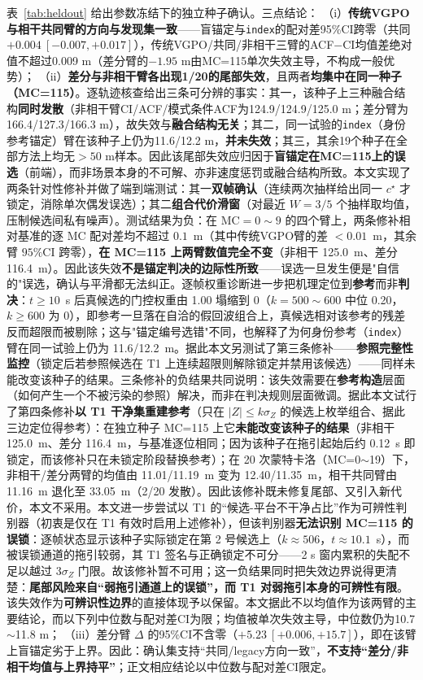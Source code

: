 \documentclass[UTF8,a4paper,zihao=-4]{ctexart}
\begin{document}
表~\ref{tab:heldout} 给出参数冻结下的独立种子确认。三点结论：
（i）\textbf{传统VGPO与相干共同臂的方向与发现集一致}——盲锚定与\texttt{index}的配对差95\%CI跨零（共同 $+0.004\ [-0.007,+0.017]$），传统VGPO/共同/非相干三臂的ACF$-$CI均值差绝对值不超过0.009 m（差分臂的$-1.95$ m由MC=115单次失效主导，不构成一般优势）；
（ii）\textbf{差分与非相干臂各出现1/20的尾部失效}，且两者\textbf{均集中在同一种子（MC=115）}。逐轨迹核查给出三条可分辨的事实：其一，该种子上三种融合结构\textbf{同时发散}（非相干臂CI/ACF/模式条件ACF为124.9/124.9/125.0 m；差分臂为166.4/127.3/166.3 m），故失效与\textbf{融合结构无关}；其二，同一试验的\texttt{index}（身份参考锚定）臂在该种子上仍为11.6/12.2 m，\textbf{并未失效}；其三，其余19个种子在全部方法上均无$>50$ m样本。因此该尾部失效应归因于\textbf{盲锚定在MC=115上的误选}（前端），而非场景本身的不可解、亦非速度惩罚或融合结构所致。本文实现了两条针对性修补并做了端到端测试：其一\textbf{双帧确认}（连续两次抽样给出同一 \(c^\star\) 才锁定，消除单次偶发误选）；其二\textbf{组合代价滑窗}（对最近 $W=3/5$ 个抽样取均值，压制候选间私有噪声）。测试结果为负：在 MC$=0\sim9$ 的四个臂上，两条修补相对基准的逐 MC 配对差均不超过 $0.1$~m（其中传统VGPO臂的差 $<0.01$~m，其余臂 $95\%$CI 跨零），\textbf{在 MC=115 上两臂数值完全不变}（非相干 125.0~m、差分 116.4~m）。因此该失效\textbf{不是锚定判决的边际性所致}——误选一旦发生便是"自信的"误选，确认与平滑都无法纠正。逐帧权重诊断进一步把机理定位到\textbf{参考}而非\textbf{判决}：\(t\ge10\)~s 后真候选的门控权重由 1.00 塌缩到 0（\(k=500\sim600\) 中位 0.20，\(k\ge600\) 为 0），即参考一旦落在自洽的假回波组合上，真候选相对该参考的残差反而超限而被剔除；这与"锚定编号选错"不同，也解释了为何身份参考（\texttt{index}）臂在同一试验上仍为 11.6/12.2~m。据此本文另测试了第三条修补——\textbf{参照完整性监控}（锁定后若参照候选在 T1 上连续超限则解除锁定并禁用该候选）——同样未能改变该种子的结果。三条修补的负结果共同说明：该失效需要在\textbf{参考构造}层面（如何产生一个不被污染的参照）解决，而非在判决规则层面微调。据此本文试行了第四条修补\textbf{以 T1 干净集重建参考}（只在 $|Z|\le k\sigma_Z$ 的候选上枚举组合、据此三边定位得参考）：在独立种子 MC=115 上它\textbf{未能改变该种子的结果}（非相干 125.0~m、差分 116.4~m，与基准逐位相同；因为该种子在拖引起始后约 0.12~s 即锁定，而该修补只在未锁定阶段替换参考）；在 20 次蒙特卡洛（MC=0\(\sim\)19）下，非相干/差分两臂的均值由 11.01/11.19~m 变为 12.40/11.35~m，相干共同臂由 11.16~m 退化至 33.05~m（2/20 发散）。因此该修补既未修复尾部、又引入新代价，本文不采用。本文进一步尝试以 T1 的“候选-平台不干净占比”作为可辨性判别器（初衷是仅在 T1 有效时启用上述修补），但该判别器\textbf{无法识别 MC=115 的误锁}：逐帧状态显示该种子实际锁定在第 2 号候选上（\(k\approx506\)，\(t\approx10.1\)~s），而被误锁通道的拖引较弱，其 T1 签名与正确锁定不可分——2 s 窗内累积的失配不足以越过 \(3\sigma_Z\) 门限。故该修补暂不可用；这一负结果同时把失效边界说得更清楚：\textbf{尾部风险来自“弱拖引通道上的误锁”，而 T1 对弱拖引本身的可辨性有限}。该失效作为\textbf{可辨识性边界}的直接体现予以保留。本文据此不以均值作为该两臂的主要结论，而以下列中位数与配对差CI为限；均值被单次失效主导，中位数仍为10.7$\sim$11.8 m；
（iii）差分臂 $\Delta$ 的95\%CI不含零（$+5.23\ [+0.006,+15.7]$），即在该臂上盲锚定劣于上界。因此：确认集支持“共同/legacy方向一致”，\textbf{不支持“差分/非相干均值与上界持平”}；正文相应结论以中位数与配对差CI限定。
\end{document}
